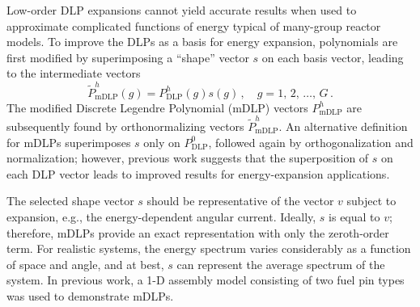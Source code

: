 \documentclass[5p,times,twocolumn,10pt]{elsarticle}
\begin{document}
  Low-order DLP expansions cannot 
  yield accurate results when used to approximate 
  complicated functions of energy typical of many-group reactor models.
  To improve the DLPs as a basis for energy expansion,
  polynomials are first modified by superimposing a ``shape'' vector $s$ 
  on each basis vector, leading to the intermediate vectors
  \begin{equation}
    \tilde{P}^h_{\text{mDLP}}(g) =  
    P^h_{\text{DLP}}(g) s(g) \,, \quad g = 1,\, 2,\, \ldots ,\, G \, .
  \end{equation}
  The modified Discrete Legendre Polynomial (mDLP) vectors  $P^h_{\text{mDLP}}$ are subsequently found by 
  orthonormalizing vectors $\tilde{P}^h_{\text{mDLP}}$.  An alternative 
  definition for mDLPs superimposes $s$ only on $P^0_{\text{DLP}}$,
  followed again by orthogonalization and normalization; however,
  previous work suggests that the superposition of $s$ on each 
  DLP vector leads to improved results for energy-expansion 
  applications\cite{Roberts2014}.
  
  The selected shape vector $s$ should be representative of the vector $v$ 
  subject to expansion, e.g., the energy-dependent angular current.  
  Ideally, $s$ is equal to $v$; therefore, 
  mDLPs provide an exact representation with only the zeroth-order term.
  For realistic systems, the energy spectrum varies considerably as 
  a function of space and angle, and at best, $s$ can represent the 
  average spectrum of the system.
  In previous work, a 1-D assembly model consisting of 
  two fuel pin types was used to demonstrate mDLPs\cite{Roberts2014}.  
  
  
  
  
  
\end{document}
